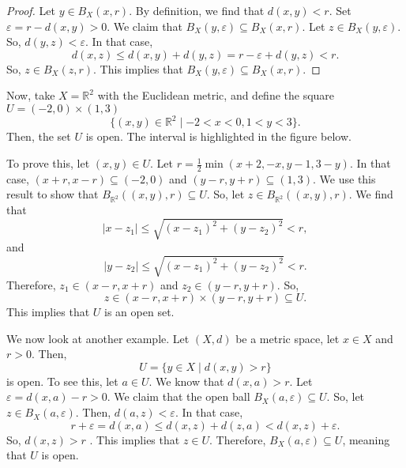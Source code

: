 \documentclass[a4paper, openany]{memoir}
\theoremstyle{definition}
\theoremstyle{plain}
\begin{document}
\begin{proof}
Let $y \in B_X(x, r)$. By definition, we find that $d(x, y) < r$. Set $\varepsilon = r - d(x, y) > 0$. We claim that $B_X(y, \varepsilon) \subseteq B_X(x, r)$. Let $z \in B_X(y, \varepsilon)$. So, $d(y, z) < \varepsilon$. In that case,
\[d(x, z) \leqslant d(x, y) + d(y, z) = r - \varepsilon + d(y, z) < r.\]
So, $z \in B_X(z, r)$. This implies that $B_X(y, \varepsilon) \subseteq B_X(x, r)$.
\end{proof}

Now, take $X = \mathbb{R}^2$ with the Euclidean metric, and define the square $U = (-2, 0) \times (1, 3)$
\[\{(x, y) \in \mathbb{R}^2 \mid -2 < x < 0, 1 < y < 3\}.\]
Then, the set $U$ is open. The interval is highlighted in the figure below.
\begin{figure}[H]
    \centering
\end{figure}
\noindent To prove this, let $(x, y) \in U$. Let $r = \frac{1}{2} \min(x+2, -x, y-1, 3-y)$. In that case, $(x + r, x - r) \subseteq (-2, 0)$ and $(y-r, y+r) \subseteq (1, 3)$. We use this result to show that $B_{\mathbb{R}^2}((x, y), r) \subseteq U$. So, let $z \in B_{\mathbb{R}^2}((x, y), r)$. We find that 
\[|x - z_1| \leqslant \sqrt{(x - z_1)^2 + (y - z_2)^2} < r,\]
and
\[|y - z_2| \leqslant \sqrt{(x - z_1)^2 + (y - z_2)^2} < r.\]
Therefore, $z_1 \in (x - r, x + r)$ and $z_2 \in (y - r, y + r)$. So, 
\[z \in (x - r, x + r) \times (y-r, y+r) \subseteq U.\]
This implies that $U$ is an open set.

We now look at another example. Let $(X, d)$ be a metric space, let $x \in X$ and $r > 0$. Then,
\[U = \{y \in X \mid d(x, y) > r\}\]
is open. To see this, let $a \in U$. We know that $d(x, a) > r$. Let $\varepsilon = d(x, a) - r > 0$. We claim that the open ball $B_X(a, \varepsilon) \subseteq U$. So, let $z \in B_X(a, \varepsilon)$. Then, $d(a, z) < \varepsilon$. In that case,
\[r + \varepsilon = d(x, a) \leqslant d(x, z) + d(z, a) < d(x, z) + \varepsilon.\]
So, $d(x, z) > r$ . This implies that $z \in U$. Therefore, $B_X(a, \varepsilon) \subseteq U$, meaning that $U$ is open.
\end{document}
